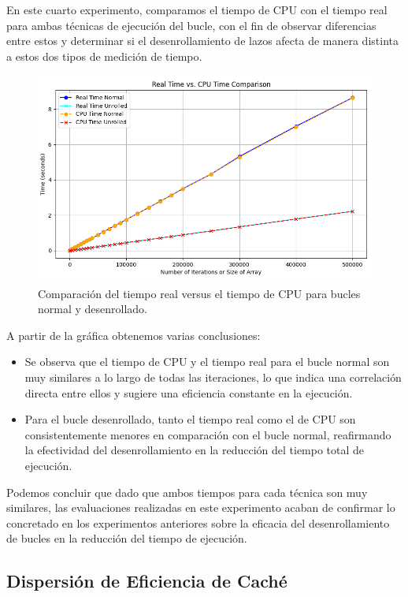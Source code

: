 \documentclass[a4paper,twocolumn]{article}
\begin{document}
En este cuarto experimento, comparamos el tiempo de CPU con el tiempo real para ambas técnicas de ejecución del bucle, con el fin de observar diferencias entre estos y determinar si el desenrollamiento de lazos afecta de manera distinta a estos dos tipos de medición de tiempo.

\begin{figure}[H]
    \centering
    \includegraphics[width=\columnwidth]{img/times.png}
    \caption{Comparación del tiempo real versus el tiempo de CPU para bucles normal y desenrollado.}
    \label{fig:real_vs_cpu_time}
\end{figure}

A partir de la gráfica obtenemos varias conclusiones:

\begin{itemize}
    \item Se observa que el tiempo de CPU y el tiempo real para el bucle normal son muy similares a lo largo de todas las iteraciones, lo que indica una correlación directa entre ellos y sugiere una eficiencia constante en la ejecución.
    \item Para el bucle desenrollado, tanto el tiempo real como el de CPU son consistentemente menores en comparación con el bucle normal, reafirmando la efectividad del desenrollamiento en la reducción del tiempo total de ejecución.
\end{itemize}

Podemos concluir que dado que ambos tiempos para cada técnica son muy similares, las evaluaciones realizadas en este experimento acaban de confirmar lo concretado en los experimentos anteriores sobre la eficacia del desenrollamiento de bucles en la reducción del tiempo de ejecución.

\subsection{Dispersión de Eficiencia de Caché}
\end{document}
